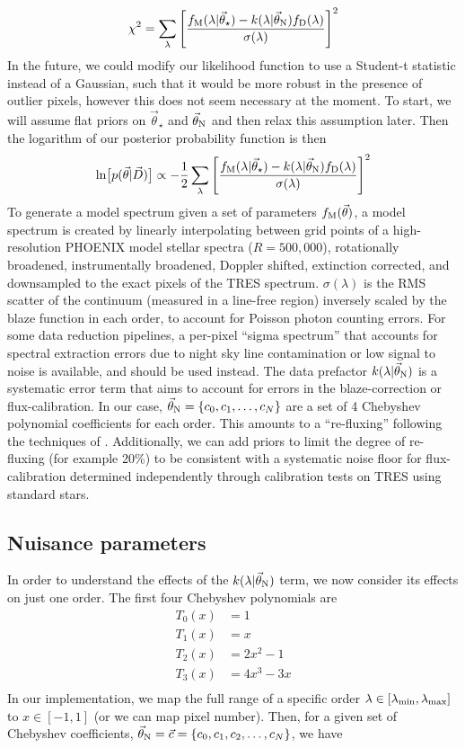 \documentclass[preprint]{aastex} %
\newcommand{\vt}{\vec{\theta}}
\newcommand{\vstar}{\vt_{\star}}
\newcommand{\vN}{\vt_{\rm N}}
\newcommand{\vc}{\vec{c}}
\newcommand{\fM}{f_{\rm M}}
\newcommand{\fD}{f_{\rm D}}
\newcommand{\vD}{\vec{D}}
\begin{document}
\begin{equation}
  \chi^2 = \sum_\lambda \left [\frac{\fM(\lambda | \vstar) - k(\lambda | \vN) \fD(\lambda) }{\sigma(\lambda)} \right ]^2
\end{equation}
In the future, we could modify our likelihood function to use a Student-t statistic instead of a Gaussian, such that it would be more robust in the presence of outlier pixels, however this does not seem necessary at the moment. To start, we will assume flat priors on $\vstar$ and $\vN$ and then relax this assumption later. Then the logarithm of our posterior probability function is then
\begin{equation}
  \ln \bigl [p(\vt | \vD) \bigr] \propto - \frac{1}{2} \sum_\lambda \left [\frac{\fM(\lambda | \vstar) - k(\lambda | \vN) \fD(\lambda) }{\sigma(\lambda)} \right ]^2
  \label{eqn:lnprob}
\end{equation}
To generate a model spectrum given a set of parameters $\fM(\vt)$, a model spectrum is created by linearly interpolating between grid points of a high-resolution PHOENIX model stellar spectra ($R = 500,000$), rotationally broadened, instrumentally broadened, Doppler shifted, extinction corrected, and downsampled to the exact pixels of the TRES spectrum. $\sigma(\lambda)$ is the RMS scatter of the continuum (measured in a line-free region) inversely scaled by the blaze function in each order, to account for Poisson photon counting errors. For some data reduction pipelines, a per-pixel ``sigma spectrum'' that accounts for spectral extraction errors due to night sky line contamination or low signal to noise is available, and should be used instead. The data prefactor $k(\lambda | \vN)$ is a systematic error term that aims to account for errors in the blaze-correction or flux-calibration. In our case, $\vN = \{c_0, c_1, \ldots, c_N\}$ are a set of 4 Chebyshev polynomial coefficients for each order. This amounts to a ``re-fluxing'' following the techniques of \citet{elh+06}. Additionally, we can add priors to limit the degree of re-fluxing (for example 20\%) to be consistent with a systematic noise floor for flux-calibration determined independently through calibration tests on TRES using standard stars.

\subsection{Nuisance parameters}
In order to understand the effects of the $k(\lambda | \vN)$ term, we now consider its effects on just one order. The first four Chebyshev polynomials are 
\begin{align*}
  T_0(x) &= 1\\
  T_1(x) &= x\\
  T_2(x) &= 2 x^2 - 1\\
  T_3(x) &= 4 x^3 - 3x\\
\end{align*}
In our implementation, we map the full range of a specific order $\lambda \in [\lambda_{\rm min}, \lambda_{\rm max}]$ to $x \in [-1, 1]$ (or we can map pixel number). Then, for a given set of Chebyshev coefficients, $\vN = \vc = \{ c_0, c_1, c_2, \ldots, c_N \}$, we have 
\end{document}
